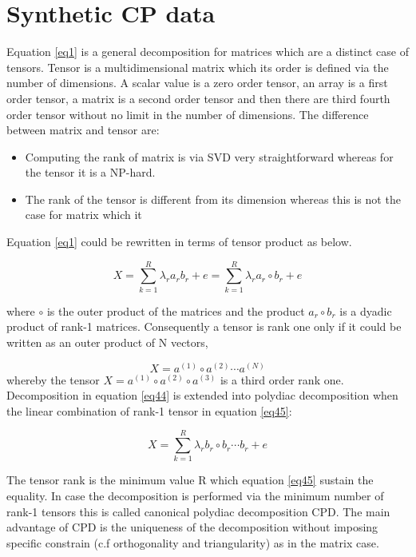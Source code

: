 \section{Synthetic CP data}

Equation \ref{eq1} is a general decomposition for matrices which are a distinct case of tensors. Tensor is a multidimensional matrix which its order is defined via the number of dimensions. A scalar value is a zero order tensor, an array is a first order tensor, a matrix is a second order tensor and then there are third fourth order tensor without no limit in the number of dimensions. 
The difference between matrix and tensor are:

\begin{itemize}
    \item Computing the rank of matrix is via SVD very straightforward whereas for the tensor it is a NP-hard.
    \item The rank of the tensor is different from its dimension whereas this is not the case for matrix which it 
\end{itemize}

Equation \ref{eq1} could be rewritten in terms of tensor product as below.


\begin{equation}\label{eq44}
    X=\sum_{k=1}^{R}\lambda_{r}a_{r}b_{r}+e=\sum_{k=1}^{R}\lambda_{r}a_{r}\circ b_{r}+e
\end{equation}

where $\circ$ is the outer product of the matrices and the product $a_{r}\circ b_{r}$ is a dyadic product of rank-1 matrices. Consequently a tensor is rank one only if it could be written as an outer product of N vectors, 

\begin{equation}
    X=a^{(1)}\circ a^{(2)}\cdots a^{(N)}
\end{equation}
whereby the tensor $X=a^{(1)}\circ a^{(2)}\circ a^{(3)}$ is a third order rank one. 
Decomposition in equation \ref{eq44} is extended into polydiac decomposition when the linear combination of rank-1 tensor in equation \ref{eq45}:

\begin{equation}\label{eq45}
    X=\sum_{k=1}^{R}\lambda_{r}b_{r}\circ b_{r}\cdots b_{r}+e
\end{equation}



The tensor rank is the minimum value R which equation \ref{eq45} sustain the equality. In case the decomposition is performed via the minimum number of rank-1 tensors this is called canonical polydiac decomposition CPD. The main advantage of CPD is the uniqueness of the decomposition without imposing specific constrain (c.f orthogonality and triangularity) as in the matrix case.  

